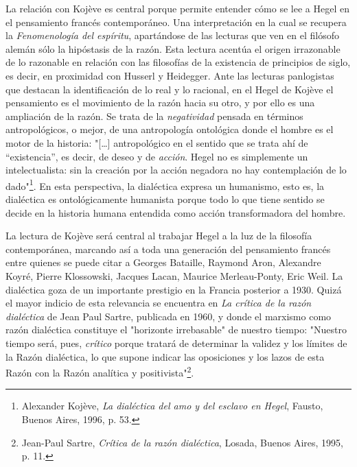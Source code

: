 \documentclass{book}
\begin{document}
La relación con Kojève es central porque permite entender cómo se lee a
Hegel en el pensamiento francés contemporáneo. Una interpretación en la
cual se recupera la \emph{Fenomenología del espíritu}, apartándose de
las lecturas que ven en el filósofo alemán sólo la hipóstasis de la
razón. Esta lectura acentúa el origen irrazonable de lo razonable en
relación con las filosofías de la existencia de principios de siglo, es
decir, en proximidad con Husserl y Heidegger. Ante las lecturas
panlogistas que destacan la identificación de lo real y lo racional, en
el Hegel de Kojève el pensamiento es el movimiento de la razón hacia su
otro, y por ello es una ampliación de la razón. Se trata de la
\emph{negatividad} pensada en términos antropológicos, o mejor, de una
antropología ontológica donde el hombre es el motor de la historia:
"{[}\ldots{]} antropológico en el sentido que se trata ahí de
``existencia'', es decir, de deseo y de \emph{acción}. Hegel no es
simplemente un intelectualista: sin la creación por la acción negadora
no hay contemplación de lo dado"\footnote{Alexander Kojève, \emph{La
  dialéctica del amo y del esclavo en Hegel}, Fausto, Buenos Aires,
  1996, p. 53.}. En esta perspectiva, la dialéctica expresa un
humanismo, esto es, la dialéctica es ontológicamente humanista porque
todo lo que tiene sentido se decide en la historia humana entendida como
acción transformadora del hombre.

La lectura de Kojève será central al trabajar Hegel a la luz de la
filosofía contemporánea, marcando así a toda una generación del
pensamiento francés entre quienes se puede citar a Georges Bataille,
Raymond Aron, Alexandre Koyré, Pierre Klossowski, Jacques Lacan, Maurice
Merleau-Ponty, Eric Weil. La dialéctica goza de un importante prestigio
en la Francia posterior a 1930. Quizá el mayor indicio de esta
relevancia se encuentra en \emph{La crítica de la razón dialéctica} de
Jean Paul Sartre, publicada en 1960, y donde el marxismo como razón
dialéctica constituye el "horizonte irrebasable" de nuestro tiempo:
"Nuestro tiempo será, pues, \emph{crítico} porque tratará de determinar
la validez y los límites de la Razón dialéctica, lo que supone indicar
las oposiciones y los lazos de esta Razón con la Razón analítica y
positivista"\footnote{Jean-Paul Sartre, \emph{Crítica de la razón
  dialéctica}, Losada, Buenos Aires, 1995, p. 11.}.
\end{document}
